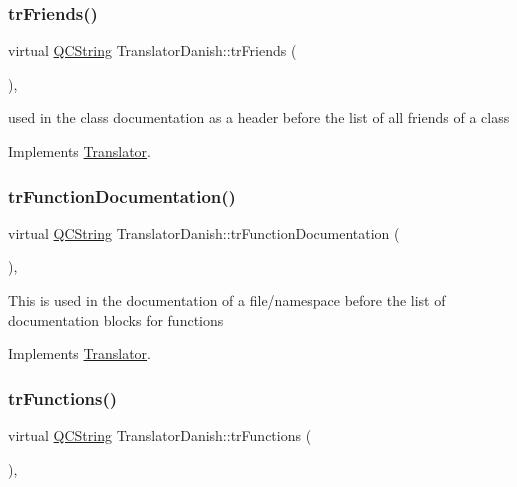 \subsubsection{\texorpdfstring{trFriends()}{trFriends()}}
{\footnotesize\ttfamily virtual \mbox{\hyperlink{class_q_c_string}{Q\+C\+String}} Translator\+Danish\+::tr\+Friends (\begin{DoxyParamCaption}{ }\end{DoxyParamCaption})\hspace{0.3cm}{\ttfamily [inline]}, {\ttfamily [virtual]}}

used in the class documentation as a header before the list of all friends of a class 

Implements \mbox{\hyperlink{class_translator}{Translator}}.

\mbox{\label{class_translator_danish_a0bf26de2a9d886f7046fe57b6ca8c7ec}} 
\subsubsection{\texorpdfstring{trFunctionDocumentation()}{trFunctionDocumentation()}}
{\footnotesize\ttfamily virtual \mbox{\hyperlink{class_q_c_string}{Q\+C\+String}} Translator\+Danish\+::tr\+Function\+Documentation (\begin{DoxyParamCaption}{ }\end{DoxyParamCaption})\hspace{0.3cm}{\ttfamily [inline]}, {\ttfamily [virtual]}}

This is used in the documentation of a file/namespace before the list of documentation blocks for functions 

Implements \mbox{\hyperlink{class_translator}{Translator}}.

\mbox{\label{class_translator_danish_a43ed9c54a8127fd53edef674ffac756c}} 
\subsubsection{\texorpdfstring{trFunctions()}{trFunctions()}}
{\footnotesize\ttfamily virtual \mbox{\hyperlink{class_q_c_string}{Q\+C\+String}} Translator\+Danish\+::tr\+Functions (\begin{DoxyParamCaption}{ }\end{DoxyParamCaption})\hspace{0.3cm}{\ttfamily [inline]}, {\ttfamily [virtual]}}

